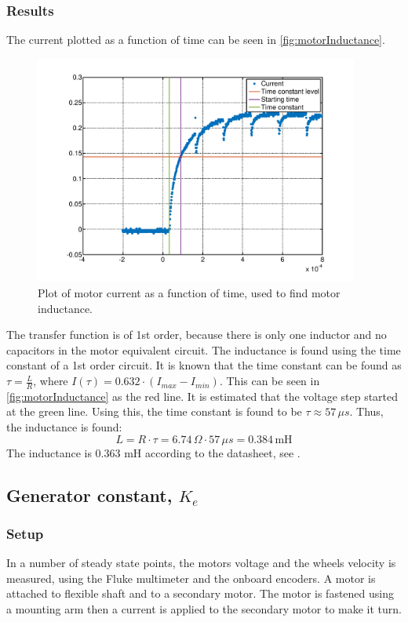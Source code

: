\subsubsection{Results}
The current plotted as a function of time can be seen in \autoref{fig:motorInductance}. 
\begin{figure}[H]
	\centering
	\includegraphics[width=0.95\textwidth]{figures/motorMeasurements/inductance.pdf}
	\caption{Plot of motor current as a function of time, used to find motor inductance.}
	\label{fig:motorInductance}
\end{figure}
The transfer function is of 1st order, because there is only one inductor and no capacitors in the motor equivalent circuit.
The inductance is found using the time constant of a 1st order circuit. It is known that the time constant can be found as $\tau = \frac{L}{R}$, where $I(\tau) = 0.632 \cdot (I_{max} - I_{min})$.
This can be seen in \autoref{fig:motorInductance} as the red line. It is estimated that the voltage step started at the green line. Using this, the time constant is found to be $\tau \approx 57 \, \mu s$.
Thus, the inductance is found:
$$L = R \cdot \tau = 6.74 \, \Omega \cdot 57 \, \mu s = 0.384 \, \text{mH}$$
The inductance is 0.363 mH according to the datasheet, see \citep{maxon}.

\clearpage
\subsection{Generator constant, $K_e$}
\subsubsection{Setup}
In a number of steady state points, the motors voltage and the wheels velocity is measured, using the Fluke multimeter and the onboard encoders. A motor is attached to flexible shaft and to a secondary motor. The motor is fastened using a mounting arm then a current is applied to the secondary motor to make it turn. 

